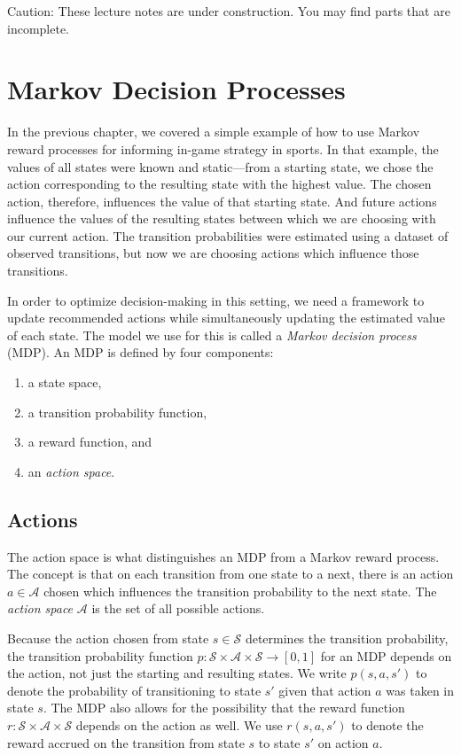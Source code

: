\documentclass{article}
\begin{document}
  \begin{framed}
    {\sc Caution:} These lecture notes are under construction. You may find parts that are incomplete.
  \end{framed}

  \setcounter{section}{7}
  \section{\sc Markov Decision Processes}

    In the previous chapter, we covered a simple example of how to use Markov reward processes for informing in-game strategy in sports. In that example, the values of all states were known and static---from a starting state, we chose the action corresponding to the resulting state with the highest value. The chosen action, therefore, influences the value of that starting state. And future actions influence the values of the resulting states between which we are choosing with our current action. The transition probabilities were estimated using a dataset of observed transitions, but now we are choosing actions which influence those transitions.

    In order to optimize decision-making in this setting, we need a framework to update recommended actions while simultaneously updating the estimated value of each state. The model we use for this is called a {\it Markov decision process} (MDP). An MDP is defined by four components:
    \begin{enumerate}
      \item a state space,
      \item a transition probability function,
      \item a reward function, and
      \item an {\it action space}.
    \end{enumerate}

    \subsection{\sc Actions}

      The action space is what distinguishes an MDP from a Markov reward process. The concept is that on each transition from one state to a next, there is an action $a \in \mathcal{A}$ chosen which influences the transition probability to the next state. The {\it action space} $\mathcal{A}$ is the set of all possible actions.

      Because the action chosen from state $s \in \mathcal{S}$ determines the transition probability, the transition probability function $p : \mathcal{S} \times \mathcal{A} \times \mathcal{S} \rightarrow [0, 1]$ for an MDP depends on the action, not just the starting and resulting states. We write $p(s, a, s')$ to denote the probability of transitioning to state $s'$ given that action $a$ was taken in state $s$. The MDP also allows for the possibility that the reward function $r : \mathcal{S} \times \mathcal{A} \times \mathcal{S}$ depends on the action as well. We use $r(s, a, s')$ to denote the reward accrued on the transition from state $s$ to state $s'$ on action $a$.
\end{document}
